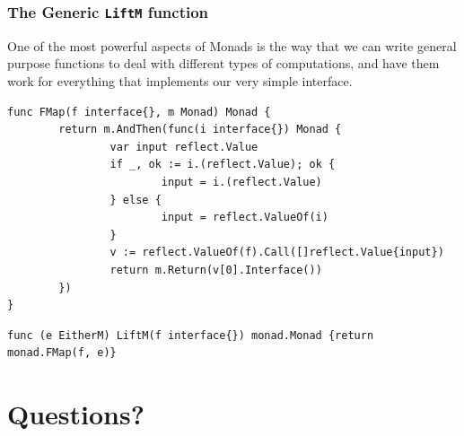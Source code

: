 \documentclass{beamer}
\begin{document}
\begin{frame}[fragile]
  \frametitle{The Generic {\tt LiftM} function}
  One of the most powerful aspects of Monads is the way that we can
  write general purpose functions to deal with different types of
  computations, and have them work for everything that implements our
  very simple interface.
\begin{lstlisting}[language=Golang]
func FMap(f interface{}, m Monad) Monad {
        return m.AndThen(func(i interface{}) Monad {
                var input reflect.Value
                if _, ok := i.(reflect.Value); ok {
                        input = i.(reflect.Value)
                } else {
                        input = reflect.ValueOf(i)
                }
                v := reflect.ValueOf(f).Call([]reflect.Value{input})
                return m.Return(v[0].Interface())
        })
}
\end{lstlisting}

\begin{lstlisting}[language=Golang]
func (e EitherM) LiftM(f interface{}) monad.Monad {return monad.FMap(f, e)}
\end{lstlisting}
\end{frame}

\section{Questions?}
\end{document}
